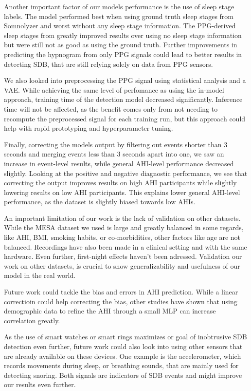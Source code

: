 Another important factor of our models performance is the use of sleep stage labels. The model performed best when using ground truth sleep stages from Somnolyzer and worst without any sleep stage information. The PPG-derived sleep stages from \cite{bakker2021estimating} greatly improved results over using no sleep stage information but were still not as good as using the ground truth. Further improvements in predicting the hypnogram from only PPG signals could lead to better results in detecting SDB, that are still relying solely on data from PPG sensors.

We also looked into preprocessing the PPG signal using statistical analysis and a VAE. While achieving the same level of perfomance as using the in-model approach, training time of the detection model decreased significantly. Inference time will not be affected, as the benefit comes only from not needing to recompute the preprocessed signal for each training run, but this approach could help with rapid prototyping and hyperparameter tuning.

Finally, correcting the models output by filtering out events shorter than 3 seconds and merging events less than 3 seconds apart into one, we saw an increase in event-level results, while general AHI-level performance decreased slightly. Looking at the positive and negative diagnostic performance, we see that correcting the output improves results on high AHI participants while slightly lowering results on low AHI participants. This explains lower general AHI-level performance, as the dataset is slightly biased towards low AHIs.


An important limitation of our work is the lack of validation on other datasets. While the MESA dataset we used is large and greatly balanced in some regards, like AHI, BMI, smoking habits, or co-morbidities, other factors like age are not balanced. Recordings have also been made in a clinical setting and with the same hardware. Even further, first-night effects haven't been adressed.
Validation our work on other datasets, is crucial to show generalizability and usefulness of our model in the real world.


Future work could tackle the bias and errors in AHI prediction. While a linear correctioin could help correcting the bias, other studies have shown that using demographic data to refine the AHI through a small MLP can increase correlation greatly.

As the use of smart watches or smart rings maximizes or goal of inobtrusive SDB detection even further, future work could also look into using other sensors that are already available on these devices. One example is the accelerometer, which records movements during sleep, or breathing sounds, that are mainly used for detecting snoring. Both signals are indicators of SDB events and might improve our results even further.